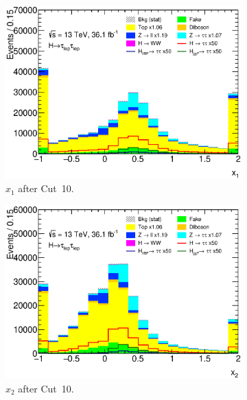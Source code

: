 \begin{figure}[htb]
    \centering
    \begin{subfigure}[t]{0.45\textwidth}
        \includegraphics[width=\textwidth]{./plots/event_selection/presel/ll-CutHPTO-x0wide-lin.eps}
        \caption{$x_1$ after Cut~10.}\label{fig:event_selection:cutflow:x1}
    \end{subfigure}
    \begin{subfigure}[t]{0.45\textwidth}
        \includegraphics[width=\textwidth]{./plots/event_selection/presel/ll-CutHPTO-x1wide-lin.eps}
        \caption{$x_2$ after Cut~10.}\label{fig:event_selection:cutflow:x2}
    \end{subfigure}
    \begin{subfigure}[t]{0.45\textwidth}

\end{subfigure}
\end{figure}
